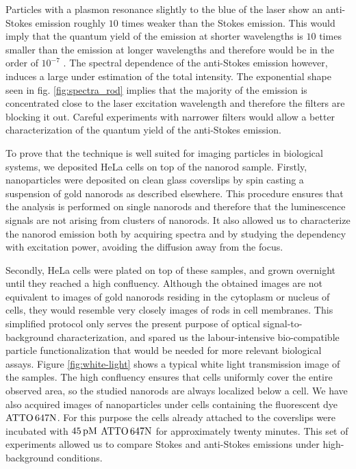 Particles with a plasmon resonance slightly to the blue of the laser
show an anti-Stokes emission roughly $10$ times weaker than the Stokes emission.
This would imply that the quantum yield of the emission at shorter wavelengths
is $10$ times smaller than the emission at longer wavelengths and therefore
would be in the order of $10^{-7}$
\cite{Yorulmaz2012,Cheng2015,Rao2015,Fang2012}. The spectral dependence of the
anti-Stokes emission however, induces a large under estimation of the total
intensity. The exponential shape seen in fig. \ref{fig:spectra_rod} implies that
the majority of the emission is concentrated close to the laser excitation
wavelength and therefore the filters are blocking it out. Careful experiments
with narrower filters would allow a better characterization of the quantum
yield of the anti-Stokes emission.

To prove that the technique is well suited for imaging particles in
biological systems, we deposited HeLa cells on top of the nanorod sample.
Firstly, nanoparticles were deposited on clean glass coverslips by spin casting
a suspension of gold nanorods as described elsewhere\cite{Zijlstra2011}. This
procedure ensures that the analysis is performed on single nanorods and
therefore that the luminescence signals are not arising from clusters of
nanorods. It also allowed us to characterize the nanorod emission both by
acquiring spectra and by studying the dependency with excitation power, avoiding
the diffusion away from the focus.

Secondly, HeLa cells were plated on top of these samples, and grown overnight
until they reached a high confluency. Although the obtained images are not
equivalent to images of gold nanorods residing in the cytoplasm or nucleus of
cells, they would resemble very closely images of rods in cell membranes. This
simplified protocol only serves the present purpose of optical
signal-to-background characterization, and spared us the labour-intensive
bio-compatible particle functionalization that would be needed for more relevant
biological assays. Figure \ref{fig:white-light} shows a typical white light
transmission image of the samples. The high confluency ensures that cells
uniformly cover the entire observed area, so the studied nanorods are always
localized below a cell. We have also acquired images of nanoparticles under
cells containing the fluorescent dye $\textrm{ATTO}\,647\textrm{N}$. For this purpose the cells already
attached to the coverslips were incubated with $45\,\textrm{pM}$ $\textrm{ATTO}\,647\textrm{N}$ for approximately
twenty minutes. This set of experiments allowed us to compare Stokes and
anti-Stokes emissions under high-background conditions.

